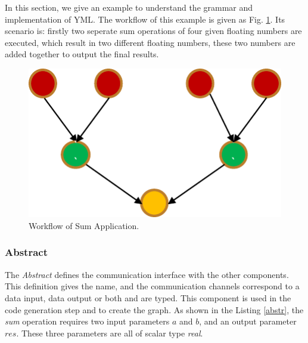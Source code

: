 In this section, we give an example to understand the grammar and implementation of YML. The workflow of this example is given as Fig. \ref{fig:sum_workflow}. Its scenario is: firstly two seperate sum operations of four given floating numbers are executed, which result in two different floating numbers, these two numbers are added together to output the final results.
 
\begin{figure}[htbp]
	\centering
	\includegraphics[width=3.in]{fig/sum_workflow.pdf}
	\caption{Workflow of Sum Application.}
	\label{fig:sum_workflow}
\end{figure}

\subsubsection{Abstract}

The \textit{Abstract} defines the communication interface with the other components. This definition gives the name, and the communication channels correspond to a data input, data output or both and are typed. This component is used in the code generation step and to create the graph. As shown in the Listing \ref{abstr}, the \textit{sum} operation requires two input parameters $a$ and $b$, and an output parameter $res$. These three parameters are all of scalar type \textit{real}. 


